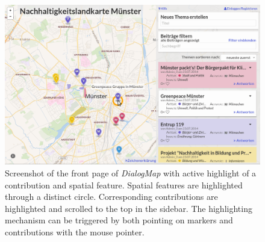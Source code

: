 \begin{figure}[!h]
    \centering
    \includegraphics[width=1\columnwidth]{images/screenshot}
    \caption{Screenshot of the front page of \textit{DialogMap} with active highlight of a contribution and spatial feature. Spatial features are highlighted through a distinct circle. Corresponding contributions are highlighted and scrolled to the top in the sidebar. The highlighting mechanism can be triggered by both pointing on markers and contributions with the mouse pointer.}
    \label{fig:screenshot}
\end{figure}

